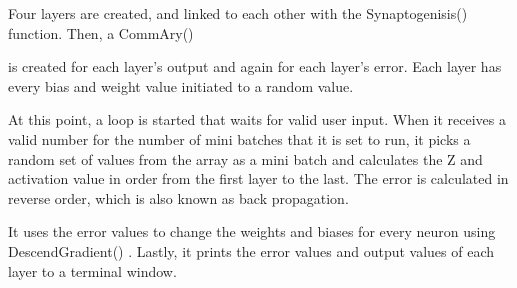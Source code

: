 \documentclass[a4paper,10pt]{article}
\newcommand{\code}[1]{ {\fontfamily{lmtt}\fontseries{b}\selectfont
	#1}
}
\begin{document}
Four layers are created, and linked to each other with the \code{Synaptogenisis()} function.  Then, a \code{CommAry()}
is created for each layer's output and again for each layer's error.  Each layer has every bias and weight value
initiated to a random value.

At this point, a loop is started that waits for valid user input.  When it receives a valid number for the number of
mini batches that it is set to run, it picks a random set of values from the array as a mini batch and calculates the Z
and activation value in order from the first layer to the last.  The error is calculated in reverse
order, which is also known as back propagation.

It uses the error values to change the weights and biases for every neuron using \\\code{DescendGradient()}. Lastly, it
prints the error values and output values of each layer to a terminal window.


 
 

\newpage
\begingroup
\raggedright
\sloppy
\printbibliography
\endgroup


 
\end{document}
